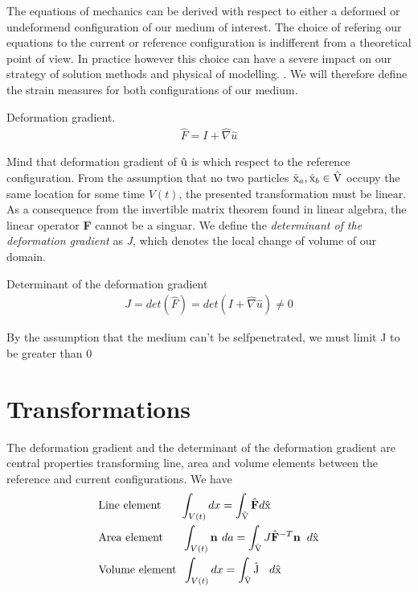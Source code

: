 The equations of mechanics can be derived with respect to either a deformed or undeformend configuration of our medium of interest. The choice of refering our equations to the current or reference configuration is indifferent from a theoretical point of view. In practice however this choice can have a severe impact on our strategy of solution methods and physical of modelling.   \cite{Wriggers2006}. We will therefore define the strain measures for both configurations of our medium.  

\begin{defn}
Deformation gradient. 
\begin{align}
\hat{F} = I + \hat{\nabla} \hat{u} 
\end{align} 
\end{defn}

Mind that deformation gradient of $\text{\^{u}}$ is which respect to the reference configuration. 
From the assumption that no two particles $\text{\^{x}}_a, \text{\^{x}}_b \in \text{\^{V}}$ occupy the same location for some time $V(t)$, the presented transformation must be linear. As a consequence from the invertible matrix theorem found in linear algebra, the linear operator \textbf{F} cannot be a singuar.  
We define the  \textit{determinant of the deformation gradient} as \textit{J}, which denotes the local change of volume of our domain. 

\begin{defn}
Determinant of the deformation gradient
\begin{align}
J = det(\hat{F}) = det( I + \hat{\nabla} \hat{u} ) \neq 0
\end{align} 
\end{defn}


By the assumption that the medium can't be selfpenetrated, we must limit  J to be greater than 0 \cite{Wriggers2006}


\section{Transformations}
The deformation gradient and the determinant of the deformation gradient are central properties transforming line, area and volume elements between the reference and current configurations.   We have
\begin{align*}
&\text{Line element} \hspace{6mm}\int_{V(t)} dx = \int_{\ha{V}} \hat{F} d\ha{x} \\
&\text{Area element} \hspace{6mm}\int_{V(t)} \textbf{n } da = \int_{\ha{V}} J\hat{F}^{-T} \textbf{n} \hspace{2mm} d\ha{x} \\
&\text{Volume element} \hspace{2mm} \int_{V(t)} dx = \int_{\ha{V}} \ha{J } \hspace{2mm} d\ha{x}
\end{align*}

